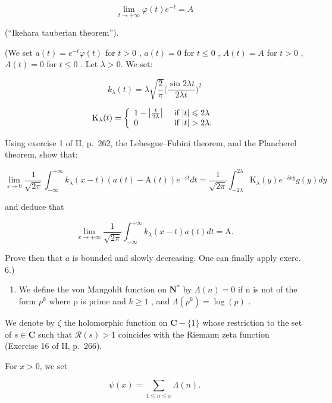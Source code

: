 \[
\lim _ {t \to + \infty} \varphi (t) e ^ {- t} = A
\]

(“Ikehara tauberian theorem”).

(We set \(a(t) = e^{-t}\varphi(t)\) for \(t > 0\) , \(a(t) = 0\) for \(t \leqslant 0\) , \(A(t) = A\) for \(t > 0\) , \(A(t) = 0\) for \(t \leqslant 0\) . Let \(\lambda > 0\). We set:

\[
k _ {\lambda} (t) = \lambda \sqrt {\frac {2}{\pi}} \Big (\frac {\sin 2 \lambda t}{2 \lambda t} \Big) ^ {2}
\]

\[
\mathrm{K} _ {\lambda} (t) = \left\{ \begin{array}{l l} 1 - \left| \frac {t}{2 \lambda} \right| & \text { if } | t | \leqslant 2 \lambda \\ 0 & \text { if } | t | > 2 \lambda . \end{array} \right.
\]

Using exercise 1 of II, p.~262, the Lebesgue–Fubini theorem, and the Plancherel theorem, show that:

\[
\lim _ {\varepsilon \to 0} \frac {1}{\sqrt {2 \pi}} \int_ {- \infty} ^ {+ \infty} k _ {\lambda} (x - t) (a (t) - \mathrm{A} (t)) e ^ {- \varepsilon t} d t = \frac {1}{\sqrt {2 \pi}} \int_ {- 2 \lambda} ^ {2 \lambda} \mathrm{K} _ {\lambda} (y) e ^ {- i x y} g (y) d y
\]

and deduce that

\[
\lim _ {x \to + \infty} \frac {1}{\sqrt {2 \pi}} \int_ {- \infty} ^ {+ \infty} k _ {\lambda} (x - t) a (t) d t = \mathrm{A}.
\]

Prove then that \(a\) is bounded and slowly decreasing. One can finally apply exerc. 6.)

\begin{enumerate}
\def\labelenumi{\arabic{enumi})}
\setcounter{enumi}{9}
\tightlist
\item
  We define the von Mangoldt function on \(\mathbf{N}^{*}\) by \(\Lambda(n)=0\) if n is not of the form \(p^{k}\) where p is prime and \(k\geqslant1\) , and \(\Lambda(p^{k})=\log(p)\) .
\end{enumerate}

We denote by \(\zeta\) the holomorphic function on \(\mathbf{C} - \{1\}\) whose restriction to the set of \(s \in \mathbf{C}\) such that \(\mathcal{R}(s) > 1\) coincides with the Riemann zeta function (Exercise 16 of II, p.~266).

For \(x > 0\), we set

\[
\psi (x) = \sum_ {1 \leqslant n \leqslant x} \Lambda (n).
\]

